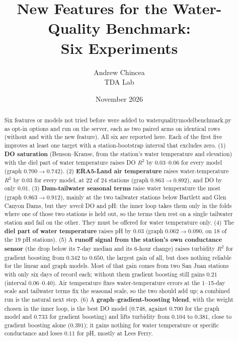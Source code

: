 \documentclass[11pt]{article}
\title{New Features for the Water-Quality Benchmark:\\
       Six Experiments}
\author{Andrew Chincea \\ TDA Lab}
\date{November 2026}
\newcommand{\codeus}{\textunderscore\allowbreak}
\newcommand{\code}[1]{{\ttfamily\let\_\codeus #1}}
\begin{document}
\maketitle

\begin{abstract}
Six features or models not tried before were added to \code{water\_quality\_model\_benchmark.py}
as opt-in options and run on the server, each as two paired arms on identical rows (without and
with the new feature). All six are reported here. Each of the first five improves at least one target with a station-bootstrap interval that excludes zero. (1) \textbf{DO saturation} (Benson--Krause, from the
station's water temperature and elevation) with the diel part of water temperature raises DO
$R^2$ by $0.03$--$0.06$ for every model (graph $0.700\to0.742$). (2) \textbf{ERA5-Land air
temperature} raises water-temperature $R^2$ by $0.03$ for every model, at 22 of 24 stations
(graph $0.863\to0.892$), and DO by only $0.01$. (3) \textbf{Dam-tailwater seasonal terms} raise
water temperature the most (graph $0.863\to0.912$), mainly at the two tailwater stations below
Bartlett and Glen Canyon Dams, but they \emph{wreck} DO and pH: the inner loop takes them only
in the folds where one of those two stations is held out, so the terms then rest on a single
tailwater station and fail on the other. They must be offered for water temperature only.
(4) The \textbf{diel part of water temperature} raises pH by $0.03$ (graph $0.062\to0.090$, on 18
of the 19 pH stations). (5) A \textbf{runoff signal from the station's own conductance sensor}
(the drop below its 7-day median and its 6-hour change) raises turbidity $R^2$ for gradient
boosting from $0.342$ to $0.650$, the largest gain of all, but does nothing reliable for the
linear and graph models. Most of that gain comes from two San Juan stations with only six days
of record each; without them gradient boosting still gains $0.21$ (interval $0.06$--$0.40$).
Air temperature fixes water-temperature errors at the 1--15-day scale and tailwater terms fix
the seasonal scale, so the two should add up; a combined run is the natural next step.
(6) A \textbf{graph--gradient-boosting blend}, with the weight chosen in the inner loop, is the best
DO model ($0.748$, against $0.700$ for the graph model and $0.733$ for gradient boosting) and lifts
turbidity from $0.104$ to $0.381$, close to gradient boosting alone ($0.391$); it gains nothing for
water temperature or specific conductance and loses $0.11$ for pH, mostly at Lees Ferry.
\end{abstract}
\end{document}

